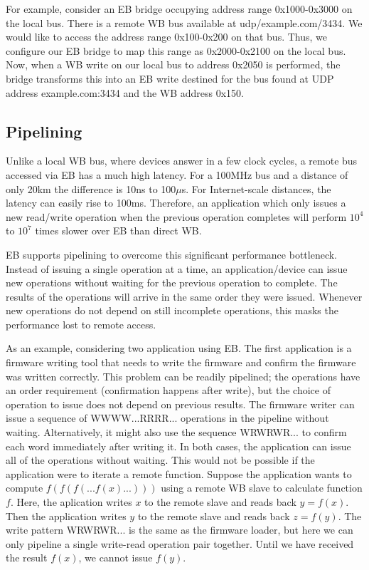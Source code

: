 \documentclass{article}
\begin{document}
For example, 
consider an EB bridge occupying address range 0x1000-0x3000 on the local bus.
There is a remote WB bus available at udp/example.com/3434.
We would like to access the address range 0x100-0x200 on that bus.
Thus, we configure our EB bridge to map this range as 0x2000-0x2100 on the
local bus.
Now, when a WB write on our local bus to address 0x2050 is performed,
the bridge transforms this into an EB write destined for 
the bus found at UDP address example.com:3434 
and the WB address 0x150.

\subsection{Pipelining}
\label{sec:pipeline}

Unlike a local WB bus, where devices answer in a few clock cycles,
a remote bus accessed via EB has a much high latency.
For a 100MHz bus and a distance of only 20km the difference is
10ns to 100$\mu$s. 
For Internet-scale distances, the latency can easily rise to 100ms.
Therefore, 
an application which only issues a new read/write operation when the previous
operation completes will perform $10^4$ to $10^7$ times slower over EB than direct WB.

EB supports pipelining to overcome this significant performance bottleneck.
Instead of issuing a single operation at a time,
an application/device can issue new operations without waiting
for the previous operation to complete.
The results of the operations will arrive in the same order they were issued.
Whenever new operations do not depend on still incomplete operations,
this masks the performance lost to remote access.

As an example, considering two application using EB.
The first application is a firmware writing tool that needs to write the
firmware and confirm the firmware was written correctly.
This problem can be readily pipelined; 
the operations have an order requirement (confirmation happens after write),
but the choice of operation to issue does not depend on previous results.
The firmware writer can issue a sequence of WWWW...RRRR... operations
in the pipeline without waiting.
Alternatively, it might also use the sequence WRWRWR... to confirm each word
immediately after writing it.
In both cases, the application can issue all of the operations without waiting.
This would not be possible if the application were to iterate a remote function.
Suppose the application wants to compute $f(f(f(...f(x)...)))$ 
using a remote WB slave to calculate function $f$.
Here, the aplication writes $x$ to the remote slave and reads back
$y = f(x)$.
Then the application writes $y$ to the remote slave and reads back
$z = f(y)$.
The write pattern WRWRWR... is the same as the firmware loader,
but here we can only pipeline a single write-read operation pair together.
Until we have received the result $f(x)$, we cannot issue $f(y)$.
\end{document}
